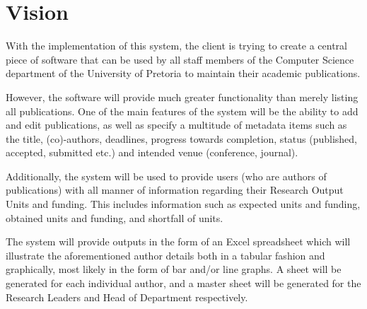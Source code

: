 \documentclass[a4paper,12pt]{article}
\begin{document}
\newpage
\section{Vision}

With the implementation of this system, the client is trying to create a central piece of software that can be used by all staff members of the Computer Science department of the University of Pretoria to maintain their academic publications.

However, the software will provide much greater functionality than merely listing all publications. One of the main features of the system will be the ability to add and edit publications, as well as specify a multitude of metadata items such as the title, (co)-authors, deadlines, progress towards completion, status (published, accepted, submitted etc.) and intended venue (conference, journal).

Additionally, the system will be used to provide users (who are authors of publications) with all manner of information regarding their Research Output Units and funding. This includes information such as expected units and funding, obtained units and funding, and shortfall of units.

The system will provide outputs in the form of an Excel spreadsheet which will illustrate the aforementioned author details both in a tabular fashion and graphically, most likely in the form of bar and/or line graphs. A sheet will be generated for each individual author, and a master sheet will be generated for the Research Leaders and Head of Department respectively.
\end{document}

